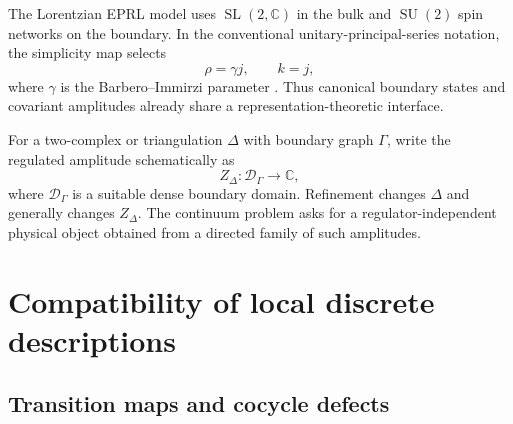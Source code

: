 \documentclass[aps,prd,reprint,nofootinbib,superscriptaddress]{revtex4-2}
\newcommand{\C}{\mathbb C}
\newcommand{\SL}{\operatorname{SL}}
\newcommand{\SU}{\operatorname{SU}}
\begin{document}
The Lorentzian EPRL model uses $\SL(2,\C)$ in the bulk and $\SU(2)$ spin networks on the boundary. In the conventional unitary-principal-series notation, the simplicity map selects
\begin{equation}
\rho=\gamma j,
\qquad
k=j,
\label{eq:EPRLmap}
\end{equation}
where $\gamma$ is the Barbero--Immirzi parameter \cite{Perez2013}. Thus canonical boundary states and covariant amplitudes already share a representation-theoretic interface.

For a two-complex or triangulation $\Delta$ with boundary graph $\Gamma$, write the regulated amplitude schematically as
\begin{equation}
Z_{\Delta}:\mathcal D_{\Gamma}\longrightarrow\C,
\label{eq:ZDelta}
\end{equation}
where $\mathcal D_{\Gamma}$ is a suitable dense boundary domain. Refinement changes $\Delta$ and generally changes $Z_{\Delta}$. The continuum problem asks for a regulator-independent physical object obtained from a directed family of such amplitudes.

\section{Compatibility of local discrete descriptions}
\label{sec:compatibility}

\subsection{Transition maps and cocycle defects}
\end{document}
